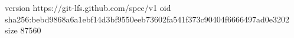 version https://git-lfs.github.com/spec/v1
oid sha256:bebd9868a6a1ebf14d3bf9550eeb73602fa541f373c90404f6666497ad0e3202
size 87560
